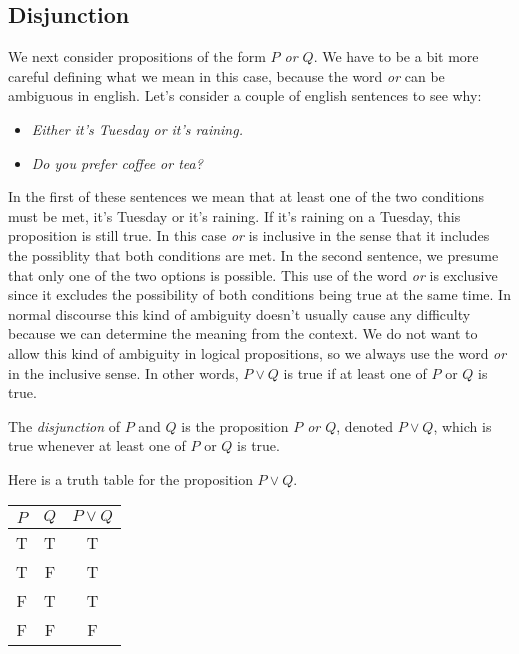 \subsection{Disjunction}

We next consider propositions of the form \emph{$P$ or $Q$}. We have to be a bit more careful defining what we mean in this case, because the word \emph{or} can be ambiguous in english. Let's consider a couple of english sentences to see why:

\begin{itemize}
\item \emph{Either it's Tuesday or it's raining.} 
\item \emph{Do you prefer coffee or tea?}
\end{itemize}

In the first of these sentences we mean that at least one of the two conditions must be met, it's Tuesday or it's raining. If it's raining on a Tuesday, this proposition is still true. In this case \emph{or} is inclusive in the sense that it includes the possiblity that both conditions are met. In the second sentence, we presume that only one of the two options is possible.
This use of the word \emph{or} is exclusive since it excludes the possibility of both conditions being true at the same time. In normal discourse this kind of ambiguity doesn't usually cause any difficulty because we can determine the meaning from the context. We do not want to allow this kind of ambiguity in logical propositions, so we always use the word \emph{or} in the inclusive sense. In other words, $P\lor Q$ is true if at least one of $P$ or $Q$ is true. 

\begin{definition}
The \emph{disjunction} of $P$ and $Q$ is the proposition \emph{$P$ or $Q$}, denoted $P\lor Q$, which is true whenever at least one of $P$ or $Q$ is true.
\end{definition}

Here is a truth table for the proposition $P\lor Q$.

\begin{center}
\begin{tabular}[t]{|c|c|c|}
\hline
$P$ & $Q$ & $P\lor Q$ \\
\hline
\hline
T & T & T \\
\hline
T & F & T \\
\hline
F & T & T \\
\hline
F & F & F \\
\hline
\end{tabular}
\end{center}

